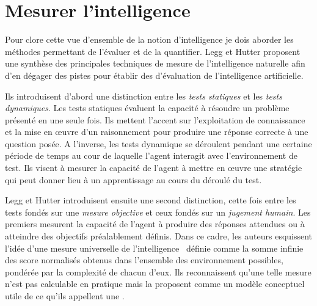 \section{Mesurer l'intelligence}

\noindent
Pour clore cette vue d'ensemble de la notion d'intelligence je dois aborder les méthodes permettant de l'évaluer et de la quantifier.
Legg et Hutter \cite{legg_universal_2007} proposent une synthèse des principales techniques de mesure de l'intelligence naturelle afin d'en dégager des pistes pour établir des  d'évaluation de l'intelligence artificielle. 

Ils introduisent d'abord une distinction entre les \emph{tests statiques} et les \emph{tests dynamiques}. 
Les tests statiques évaluent la capacité à résoudre un problème présenté en une seule fois. 
Ils mettent l'accent sur l'exploitation de connaissance et la mise en \oe uvre d'un raisonnement pour produire une réponse correcte à une question posée. 
A l'inverse, les tests dynamique se déroulent pendant une certaine période de temps au cour de laquelle l'agent interagit avec l'environnement de test. 
Ils visent à mesurer la capacité de l'agent à mettre en \oe uvre une stratégie qui peut donner lieu à un apprentissage au cours du déroulé du test. 

Legg et Hutter introduisent ensuite une second distinction, cette fois entre les tests fondés sur une \emph{mesure objective} et ceux fondés sur un \emph{jugement humain}.
Les premiers mesurent la capacité de l'agent à produire des réponses attendues ou à atteindre des objectifs préalablement définis.
Dans ce cadre, les auteurs esquissent l'idée d'une \og mesure universelle de l'intelligence \fg\ définie comme la somme infinie des score normalisés obtenus dans l'ensemble des environnement possibles, pondérée par la complexité de chacun d'eux. 
Ils reconnaissent qu'une telle mesure n'est pas calculable en pratique mais la proposent comme un modèle conceptuel utile de ce qu'ils appellent une . 

